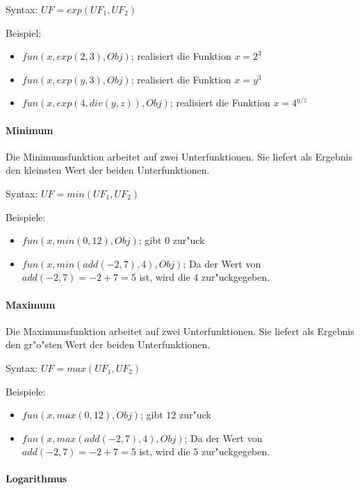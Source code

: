 \bigskip\noindent
Syntax:
$UF=exp( UF_1, UF_2 )$

\bigskip\noindent
Beispiel:
\begin{itemize}
 \item $fun(x, exp( 2, 3), Obj)$; realisiert die Funktion $x=2^3$
 \item $fun(x, exp( y, 3), Obj)$; realisiert die Funktion $x=y^3$
 \item $fun(x, exp( 4, div(y,z) ), Obj)$; realisiert die Funktion $x=4^{y/z}$
\end{itemize}


\paragraph{Minimum}

Die Minimumsfunktion arbeitet auf zwei Unterfunktionen. Sie liefert als Ergebnis den kleinsten Wert der beiden Unterfunktionen.

\bigskip\noindent
Syntax:
$UF=min( UF_1, UF_2 )$

\bigskip\noindent
Beispiele:
\begin{itemize}
 \item $fun(x, min( 0, 12 ), Obj)$; gibt $0$ zur"uck
 \item $fun(x, min( add( -2, 7 ), 4 ), Obj)$; Da der Wert von $add( -2, 7 )= -2+7 = 5$ ist, wird die $4$ zur"uckgegeben.
\end{itemize}


\paragraph{Maximum}

Die Maximumsfunktion arbeitet auf zwei Unterfunktionen. Sie liefert als Ergebnis den gr"o"sten Wert der beiden Unterfunktionen.

\bigskip\noindent
Syntax:
$UF=max( UF_1, UF_2 )$

\bigskip\noindent
Beispiele:
\begin{itemize}
 \item $fun(x, max( 0, 12 ), Obj)$; gibt $12$ zur"uck
 \item $fun(x, max( add( -2, 7 ), 4 ), Obj)$; Da der Wert von $add( -2, 7 )= -2+7 = 5$ ist, wird die $5$ zur"uckgegeben.
\end{itemize}


\paragraph{Logarithmus}


